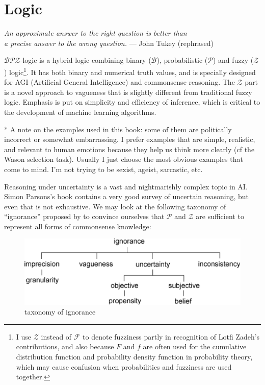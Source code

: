 \chapter{Logic}

\begin{flushright}
\emph{An approximate answer to the right question is better than\\
a precise answer to the wrong question.} --- John Tukey (rephrased)
\end{flushright}

$\mathcal{BPZ}$-logic is a hybrid logic combining binary ($\mathcal{B}$), probabilistic ($\mathcal{P}$) and fuzzy ($\mathcal{Z}$) logic\footnote{I use $\mathcal{Z}$ instead of $\mathcal{F}$ to denote fuzziness partly in recognition of Lotfi Zadeh's contributions, and also because $F$ and $f$ are often used for the cumulative distribution function and probability density function in probability theory, which may cause confusion when probabilities and fuzziness are used together.}.  It has both binary and numerical truth values, and is specially designed for AGI (Artificial General Intelligence) \citep*{Goertzel2007} and commonsense reasoning.  The $\mathcal{Z}$ part is a novel approach to vagueness that is slightly different from traditional fuzzy logic.  Emphasis is put on simplicity and efficiency of inference, which is critical to the development of machine learning algorithms.

\footnotesize
* A note on the examples used in this book:  some of them are politically incorrect or somewhat embarrassing.  I prefer examples that are simple, realistic, and relevant to human emotions because they help us think more clearly (cf the Wason selection task).  Usually I just choose the most obvious examples that come to mind.  I'm not trying to be sexist, ageist, sarcastic, etc.
\normalsize

Reasoning under uncertainty is a vast and nightmarishly complex topic in AI.  Simon Parsons's book \citep*{Parsons2001} contains a very good survey of uncertain reasoning, but even that is not exhaustive.  We may look at the following taxonomy of ``ignorance'' proposed by \citep*{Bosc1997} to convince ourselves that $\mathcal{P}$ and $\mathcal{Z}$ are sufficient to represent all forms of commonsense knowledge:
\begin{figure}[H]
\centering
\includegraphics[scale=0.7]{IgnoranceTaxonomy.eps}
\caption{taxonomy of ignorance}
\end{figure}

